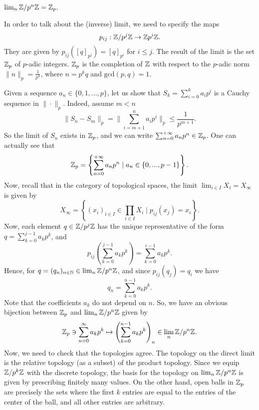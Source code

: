 \documentclass{notes}
\begin{document}
{\filip
\begin{example} $\lim_n {\mathbb{Z}}/p^n {\mathbb{Z}} = {\mathbb{Z}}_p.$ 

In order to talk about the (inverse) limit, we need to specify the maps $$p_{ij}: {\mathbb{Z}}/p^j {\mathbb{Z}} \to {\mathbb{Z}} p^i {\mathbb{Z}}.$$ They are given by $p_{ij}([q]_{p^j}) = [q]_{p^{i}}$ for $i \leq j$. The result of the limit is the set ${\mathbb{Z}}_p$ of $p$-adic integers. ${\mathbb{Z}}_p$  is the completion of ${\mathbb{Z}}$ with respect to the $p$-adic norm $\|n\|_p = \frac{1}{p^k}$, where $n=p^k q $ and $\mathrm{gcd}(p,q)=1$. 

Given a sequence $a_n \in \{0, 1, ..., p\}$, let us show that $S_k= \sum_{i=0}^k a_i p^i$ is a Cauchy sequence in $\| \cdot \|_p$. Indeed, assume $m<n$ 
$$
\|S_n- S_m\|_p = \|\sum_{i=m+1}^n a_i p^i\|_p \leq \frac{1}{p^{m+1}}.
$$
So the limit of $S_n$ exists in ${\mathbb{Z}}_p$, and we can write $\sum_{n=0}^{+\infty} a_n p^n \in {\mathbb{Z}}_p$. One can actually see that 
$$
{\mathbb{Z}}_p= \left\{\sum_{n=0}^{+\infty} a_n p^n \mid a_n \in \{0, ..., p-1\}\right \}.
$$
Now, recall that in the category of topological spaces, the limit $\lim_{i \in I} X_i = X_{\infty}$ is given by
$$
X_{\infty} = \left\{ (x_i)_{i \in I} \in \prod_{i \in I} X_i \mid  p_{ij}(x_j) = x_i \right\}.
$$
Now, each element $q \in {\mathbb{Z}} / p^j{\mathbb{Z}}$ has the unique representative of the form $q= \sum_{k=0}^{j-1} a_k p^k$, and 
$$
p_{ij}\left(\sum_{k=0}^{j-1} a_k p^k\right) = \sum_{k=0}^{i-1}a_k p^k.
$$
Hence, for $q = (q_n)_{n \in {\mathbb{N}}} \in \lim_n {\mathbb{Z}} /p^n {\mathbb{Z}}$, and since $p_{ij}(q_j)= q_i$ we have
$$
q_n = \sum_{k=0}^{n-1} a_k p^k.
$$
Note that the coefficients $a_k$ do not depend on $n$. So, we have an obvious bijection between ${\mathbb{Z}}_p$ and $\lim_n {\mathbb{Z}}/p^n {\mathbb{Z}}$ given by
$$
{\mathbb{Z}}_p \ni \sum_{n=0}^{\infty} a_k p^k \mapsto \left(\sum_{k=0}^{n-1} a_k p^k \right)_n \in \lim_n {\mathbb{Z}}/p^n {\mathbb{Z}}.
$$
Now, we need to check that the topologies agree. The topology on the direct limit is the relative topology (as a subset) of the product topology. Since we equip ${\mathbb{Z}}/ p^k {\mathbb{Z}}$ with the discrete topology, the basis for the topology on $\lim_n {\mathbb{Z}}/p^n {\mathbb{Z}}$ is given by prescribing finitely many values. On the other hand, open balls in ${\mathbb{Z}}_p$ are precisely the sets where the first $k$ entries are equal to the entries of the center of the ball, and all other entries are arbitrary.
\end{example}
}
\end{document}
